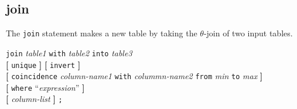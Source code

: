 \documentclass[12pt]{article}
\begin{document}
\subsection{join}

The {\tt join} statement makes a new table by taking the $\theta$-join of
two input tables.

\begin{flushleft}
{\tt join} {\em table1} {\tt with} {\em table2} {\tt into} {\em table3}  \\
{\bf[} {\tt unique} {\bf]} {\bf[} {\tt invert} {\bf]} \\
\hspace{1cm} {\bf[} {\tt coincidence} {\em column-name1} {\tt with} {\em colummn-name2} {\tt from} {\em min} {\tt to} {\em max} {\bf]} \\
\hspace{1cm} {\bf[} {\tt where} ``{\em expression}'' {\bf]} \\
\hspace{1cm} {\bf[} {\em column-list} {\bf]} {\tt ;}
\end{flushleft}
\end{document}
